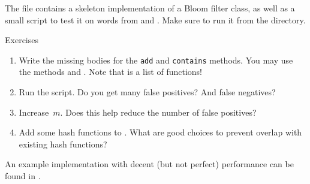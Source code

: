 The file  contains a skeleton implementation of a Bloom filter class, as well as a small script to test it on words from  and . Make sure to run it from the  directory.
%
\begin{mybox}{Exercises}
    \begin{enumerate}
        \item Write the missing bodies for the \texttt{add} and \texttt{contains} methods. You may use the methods  and . Note that  is a list of functions!
        \item Run the script. Do you get many false positives? And false negatives?
        \item Increase~$m$. Does this help reduce the number of false positives?
        \item Add some hash functions to . What are good choices to prevent overlap with existing hash functions?
    \end{enumerate}
\end{mybox}

An example implementation with decent (but not perfect) performance can be found in .


